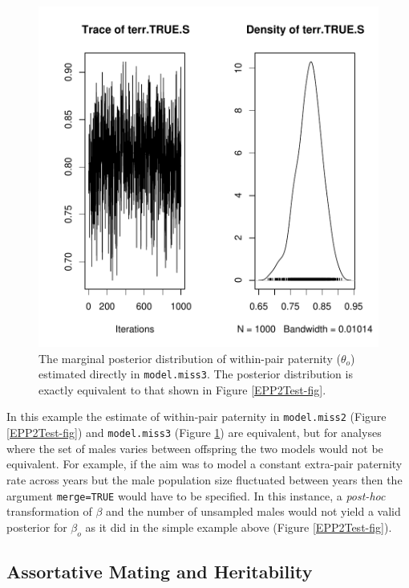 \documentclass{article}
\begin{document}
\begin{figure}[!h]
\begin{center}
\includegraphics{Tutorial-086}
\end{center}
\caption{The marginal posterior distribution of within-pair paternity   ($\theta_o$)  estimated directly in \texttt{model.miss3}. The posterior distribution is exactly equivalent to that shown in Figure \ref{EPP2Test-fig}.}
\label{EPPmerge-fig}
\end{figure}


In this example the estimate of within-pair paternity in \texttt{model.miss2} (Figure \ref{EPP2Test-fig}) and \texttt{model.miss3} (Figure \ref{EPPmerge-fig}) are equivalent, but for analyses where the set of males varies between offspring the two models would not be equivalent.  For example, if the aim was to model a constant extra-pair paternity rate across years but the male population size fluctuated between years then the argument \texttt{merge=TRUE} would have to be specified.  In this instance, a \emph{post-hoc} transformation of $\beta$ and the number of unsampled males would not yield a valid posterior for $\beta_{o}$ as it did in the simple example above (Figure \ref{EPP2Test-fig}).   

\subsection{Assortative Mating and Heritability}
\label{AMH}
\end{document}

